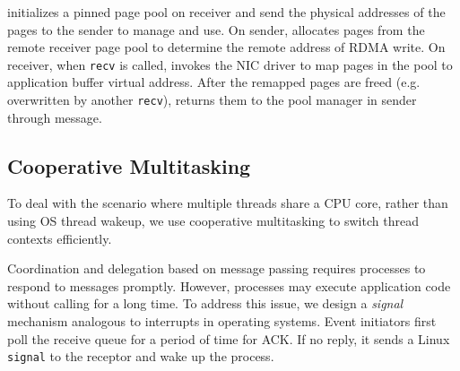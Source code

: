 \libipc{} initializes a pinned page pool on receiver and send the physical addresses of the pages to the sender to manage and use.
On sender, \libipc{} %
allocates pages from the remote receiver page pool to determine the remote address of RDMA write.
On receiver, when \texttt{recv} is called, \libipc invokes the NIC driver to map pages in the pool to application buffer virtual address.
After the remapped pages are freed (e.g. overwritten by another \texttt{recv}), \libipc{} returns them to the pool manager in sender through message.

%

\subsection{Cooperative Multitasking}
\label{subsec:process-mux}

To deal with the scenario where multiple threads share a CPU core, rather than using OS thread wakeup, we use cooperative multitasking to switch thread contexts efficiently.


Coordination and delegation based on message passing requires processes to respond to messages promptly. However, processes may execute application code without calling \libipc{} for a long time. To address this issue, we design a \textit{signal} mechanism analogous to interrupts in operating systems. Event initiators  first poll the receive queue for a period of time for ACK. If no reply, it sends a Linux \texttt{signal} to the receptor and wake up the process.

